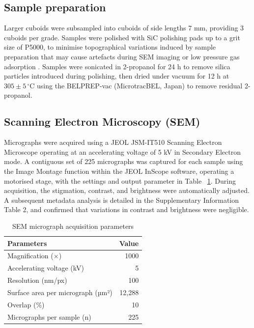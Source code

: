 \documentclass[review]{elsarticle}
\begin{document}
\subsection{Sample preparation}
Larger cuboids were subsampled into cuboids of side lengths 7 mm, providing 3
cuboids per grade. Samples were polished with SiC polishing pads up to a grit
size of P5000, to minimise topographical variations induced by sample
preparation that may cause artefacts during SEM imaging or low pressure gas
adsorption \citep{Fang2022,Jones2018}. Samples were sonicated in 2-propanol for
24 h to remove silica particles introduced during polishing, then dried under
vacuum for 12 h at $305 \pm 5 \,^\circ\mathrm{C}$ using the BELPREP-vac
(MicrotracBEL, Japan) to remove residual 2-propanol.


\subsection{Scanning Electron Microscopy (SEM)}

Micrographs were acquired using a JEOL JSM-IT510 Scanning Electron Microscope
operating at an accelerating voltage of 5 kV in Secondary Electron mode.  A
contiguous set of 225 micrographs was captured for each sample using the Image
Montage function within the JEOL InScope software, operating a motorised stage,
with the settings and output parameter in Table
~\ref{tab:microscopy_parameters}. During acquisition, the stigmation, contrast,
and brightness were automatically adjusted. A subsequent metadata analysis is
detailed in the Supplementary Information Table 2, and confirmed that variations
in contrast and brightness were negligible.

\begin{table}
  \centering
  \caption{SEM micrograph acquisition parameters}
  \label{tab:microscopy_parameters}
  \begin{tabular}{l r}
    \hline
    Parameters & Value \\
    \hline
    Magnification ($\times$)                    & 1000 \\
    Accelerating voltage (kV) & 5\\
    Resolution (nm/px)               & 100 \\
    Surface area per micrograph (µm²) & 12,288 \\
    Overlap (\%)                          & 10 \\
    Micrographs per sample (n)            & 225 \\
    \hline
  \end{tabular}%
\end{table}
\end{document}
